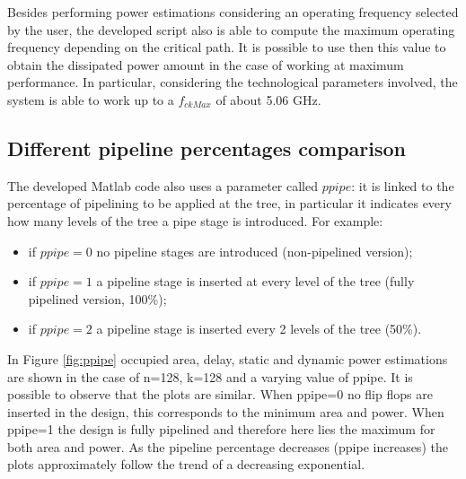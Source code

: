 Besides performing power estimations considering an operating frequency selected by the user, the developed script also is able to compute the maximum operating frequency depending on the critical path. It is possible to use then this value to obtain the dissipated power amount in the case of working at maximum performance.
In particular, considering the technological parameters involved, the system is able to work up to a $f_{ckMax}$ of about 5.06 GHz.

\subsection{Different pipeline percentages comparison}
The developed Matlab code also uses a parameter called $ppipe$: it is linked to the percentage of pipelining to be applied at the tree, in particular it indicates every how many levels of the tree a pipe stage is introduced. For example:
\begin{itemize}
	\item if $ppipe=0$ no pipeline stages are introduced (non-pipelined version);
	\item if $ppipe=1$ a pipeline stage is inserted at every level of the tree (fully pipelined version, 100\%);
	\item if $ppipe=2$ a pipeline stage is inserted every 2 levels of the tree (50\%).
\end{itemize}
In Figure \ref{fig:ppipe} occupied area, delay, static and dynamic power estimations are shown in the case of n=128, k=128 and a varying value of ppipe.
It is possible to observe that the plots are similar. When ppipe=0 no flip flops are inserted in the design, this corresponds to the minimum area and power.
When ppipe=1 the design is fully pipelined and therefore here lies the maximum for both area and power.
As the pipeline percentage decreases (ppipe increases) the plots approximately follow the trend of a decreasing exponential.


